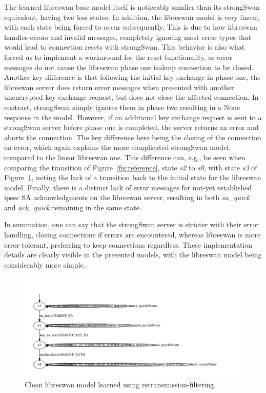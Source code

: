 The learned libreswan base model itself is noticeably smaller than its strongSwan equivalent, having two less states. In addition, the libreswan model is very linear, with each state being forced to occur subsequently. This is due to how libreswan handles errors and invalid messages, completely ignoring most error types that would lead to connection resets with strongSwan. This behavior is also what forced us to implement a workaround for the reset functionality, as error messages do not cause the libreswan phase one \ac{isakmp} connection to be closed. Another key difference is that following the initial key exchange in phase one, the libreswan server does return error messages when presented with another unencrypted key exchange request, but does not close the affected connection. In contrast, strongSwan simply ignores them in phase two resulting in a None response in the model. However, if an additional key exchange request is sent to a strongSwan server before phase one is completed, the server returns an error and aborts the connection. The key difference here being the closing of the connection on error, which again explains the more complicated strongSwan model, compared to the linear libreswan one. This difference can, e.g., be seen when comparing the transition of Figure~\ref{fig:reference}, state \emph{s2} to \emph{s0}, with state \emph{s3} of Figure~\ref{fig:learnedmodellibresimple}, noting the lack of a transition back to the initial state for the libreswan model. Finally, there is a distinct lack of error messages for not-yet established \ac{ipsec} SA acknowledgments on the libreswan server, resulting in both \emph{sa\_quick} and \emph{ack\_quick} remaining in the same state. 

In summation, one can say that the strongSwan server is stricter with their error handling, closing connections if errors are encountered, whereas libreswan is more error-tolerant, preferring to keep connections regardless. These implementation details are clearly visible in the presented models, with the libreswan model being considerably more simple.

\begin{figure}
	\centering
	\includegraphics[width=\linewidth]{images/models/LearnedModelLibreSimple}
	\caption{Clean libreswan model learned using retransmission-filtering.}
	\label{fig:learnedmodellibresimple}
\end{figure}

